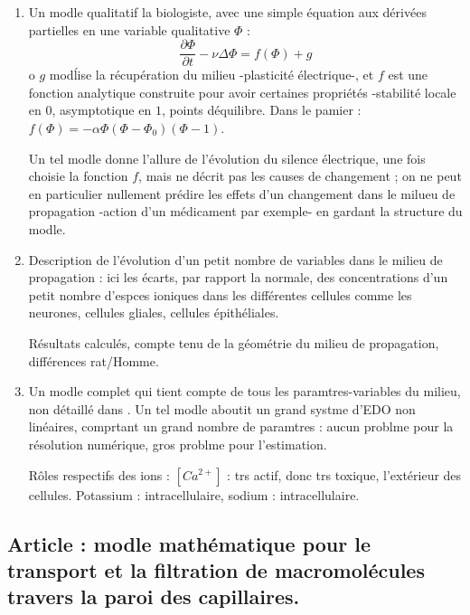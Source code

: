 \begin{enumerate}
\item Un modle qualitatif \og{}  la biologiste\fg{}, avec une simple \'equation aux d\'eriv\'ees partielles en une variable qualitative $\Phi$ :
\[\frac{\partial{\Phi}}{\partial{t}}-\nu\Delta\Phi=f(\Phi)+g\]
o $g$ mod\'lise la r\'ecup\'eration du milieu -plasticit\'e \'electrique-, et $f$ est une fonction analytique construite pour avoir certaines propri\'et\'es %
-stabilit\'e locale en $0$, asymptotique en $1$, points d\'equilibre. Dans le pamier : $f(\Phi)=-\alpha\Phi(\Phi-\Phi_0)(\Phi-1)$.

\par
Un tel modle donne l'allure de l'\'evolution du silence \'electrique, une fois choisie la fonction $f$, mais ne d\'ecrit pas les causes de changement ; %
on ne peut en particulier nullement pr\'edire les effets d'un changement dans le milueu de propagation -action d'un m\'edicament par exemple- %
en gardant la structure du modle.
\item Description de l'\'evolution d'un petit nombre de variables dans le milieu de propagation : ici les \'ecarts, par rapport  la normale, %
des concentrations d'un petit nombre d'espces ioniques dans les diff\'erentes cellules comme les neurones, cellules gliales, cellules \'epith\'eliales.

\par
R\'esultats calcul\'es, compte tenu de la g\'eom\'etrie du milieu de propagation, diff\'erences rat/Homme.

\item Un modle complet qui tient compte de tous les paramtres-variables du milieu, non d\'etaill\'e dans \cite{grexp1}. %
Un tel modle aboutit  un grand systme d'EDO non lin\'eaires, comprtant un grand nombre de paramtres : %
aucun problme pour la r\'esolution num\'erique, gros problme pour l'estimation.

\par
R\^oles respectifs des ions : $[Ca^{2+}]$ : trs actif, donc trs toxique,  l'ext\'erieur des cellules. Potassium : intracellulaire, sodium : intracellulaire.

\end{enumerate}


\subsection{Article \cite{grdr1} : modle math\'ematique pour le transport et la filtration de macromol\'ecules  travers la paroi des capillaires.}

